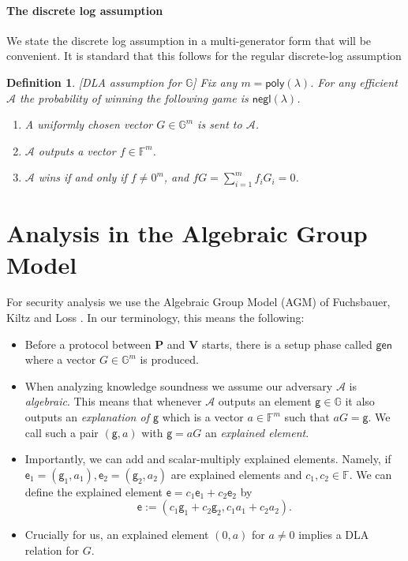 \documentclass[11pt]{article} %
\newcommand{\G}{\ensuremath{{\mathbb G}}\xspace}
\newcommand{\F}{\ensuremath{\mathbb F}\xspace}
\newcommand{\adv}{\ensuremath{\mathcal A}\xspace}
\newcommand{\negl}{\ensuremath{\mathsf{negl}(\lambda)}\xspace}
\newcommand{\defeq}{:=}
\newcommand{\gen}{\ensuremath{\mathsf{gen}}\xspace}
\newcommand{\prv}{\ensuremath{\mathsf{\mathbf{P}}}\xspace}
\newcommand{\ver}{\ensuremath{\mathsf{\mathbf{V}}}\xspace}
\newtheorem{dfn}[lemma]{Definition}
\newtheorem{remark}[lemma]{Remark}
\newcommand{\elem}{\ensuremath{\mathsf{g}}\xspace}
\newcommand{\expln}{\ensuremath{\mathsf{e}}\xspace}
\newcommand{\poly}{\ensuremath{\mathsf{poly(\lambda)}}\xspace}
\begin{document}
\paragraph{The discrete log assumption}
We state the discrete log assumption in a multi-generator form that will be convenient.
It is standard that this follows for the regular discrete-log assumption
\begin{dfn}\label{dfn:DLA}[DLA assumption for \G]
Fix any $m=\poly$.
For any efficient \adv the probability of winning the following game is \negl.
\begin{enumerate}
 \item A uniformly chosen vector $G\in \G^m$ is sent to \adv.
 \item \adv outputs a vector $f\in \F^m$.
 \item \adv wins if and only if  $f\neq 0^m$, and   $fG = \sum_{i=1}^{m}f_i G_i =0$.
\end{enumerate}
\end{dfn}
\section{Analysis in the Algebraic Group Model}\label{sec:agm}
For security analysis we use the Algebraic Group Model (AGM) of Fuchsbauer, Kiltz and Loss \cite{agm}.
In our terminology, this means the following:
\begin{itemize}
 \item Before a protocol between \prv and \ver starts, there is a setup phase called \gen where a vector $G\in \G^m$ is produced.
\item When analyzing knowledge soundness we assume our adversary \adv is \emph{algebraic}. This means that whenever \adv outputs an element $\elem \in \G$ it also outputs an \emph{explanation of \elem} which is a vector $a\in \F^m$ such that $aG=\elem$. We call such a pair $(\elem,a)$ with $\elem=aG$ an \emph{explained element}. 
\item Importantly, we can add and scalar-multiply explained elements.
Namely, if $\expln_1=(\elem_1,a_1),\expln_2= (\elem_2,a_2)$ are explained elements and $c_1,c_2\in \F$. We can define the explained element $\expln=c_1\expln_1 + c_2\expln_2$ by
\[\expln\defeq (c_1\elem_1+c_2\elem_2, c_1 a_1+c_2a_2).\]

\item Crucially for us, an explained element $(0,a)$ for $a\neq 0$ implies a DLA relation for $G$.
\end{itemize}
\end{document}
